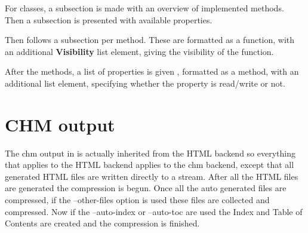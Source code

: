 For classes, a subsection is made with an overview of implemented methods.
Then a subsection is presented with available properties. 

Then follows a subsection per method. These are formatted as a function, with an
additional \textbf{Visibility} list element, giving the visibility of the
function.

After the methods, a list of properties is given , formatted as a method,
with an additional  list element, specifying whether the
property is read/write or not.

\section{CHM output}

The chm output in \fpdoc is actually inherited from the HTML backend so 
everything that applies to the HTML backend applies to the chm backend, except
that all generated HTML files are written directly to a stream. After all the
HTML files are generated the compression is begun. Once all the auto generated
files are compressed, if the --other-files option is used these files are 
collected and compressed. Now if the --auto-index or --auto-toc are used
the Index and Table of Contents are created and the compression is finished.



